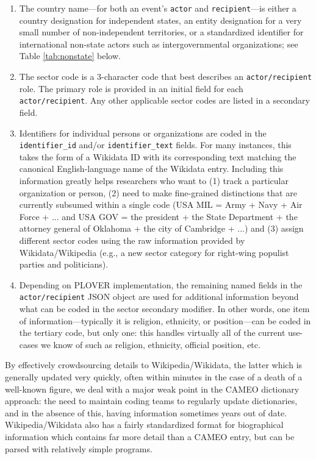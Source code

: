 \documentclass[11pt]{report}
\newcommand{\txt}[1]{\texttt{#1}}
\begin{document}
\begin{enumerate}
\item The country name---for both an event's \texttt{actor} and \texttt{recipient}---is either a country designation for independent states, an entity designation for a very small number of non-independent territories, or a standardized identifier for international non-state actors such as intergovernmental organizations; see Table \ref{tab:nonstate} below.
\item The sector code is a 3-character code that best describes an \texttt{actor/recipient} role. The primary role is provided in an initial field for each \texttt{actor/recipient}. Any other applicable sector codes are listed in a secondary field.
\item Identifiers for individual persons or organizations are coded in the \texttt{identifier\_id} and/or \texttt{identifier\_text} fields. For many instances, this takes the form of a Wikidata ID with its corresponding text matching the canonical English-language name of the Wikidata entry. Including this information greatly helps researchers who want to (1) track a particular organization or person, (2) need to make fine-grained distinctions that are currently subsumed within a single code (USA MIL = Army + Navy + Air Force + ... and USA GOV = the president + the State Department + the attorney general of Oklahoma + the city of Cambridge + ...) and (3) assign different sector codes using the raw information provided by Wikidata/Wikipedia (e.g., a new sector category for right-wing populist parties and politicians).
\item Depending on PLOVER implementation, the remaining named fields in the \txt{actor/recipient} JSON object are used for additional information beyond what can be coded in the sector secondary modifier. In other words, one item of information---typically it is religion, ethnicity, or position---can be coded in the tertiary code, but only one: this handles virtually all of the current use-cases we know of such as religion, ethnicity, official position, etc.
\end{enumerate}

By effectively crowdsourcing details to Wikipedia/Wikidata, the latter which is generally updated very quickly, often within minutes in the case of a death of a well-known figure, we deal with a major weak point in the CAMEO dictionary approach:  the need to maintain coding teams to regularly update dictionaries, and in the absence of this, having information sometimes years out of date. Wikipedia/Wikidata also has a fairly standardized format for biographical information which contains far more detail than a CAMEO entry, but can be parsed with relatively simple programs.
\end{document}
